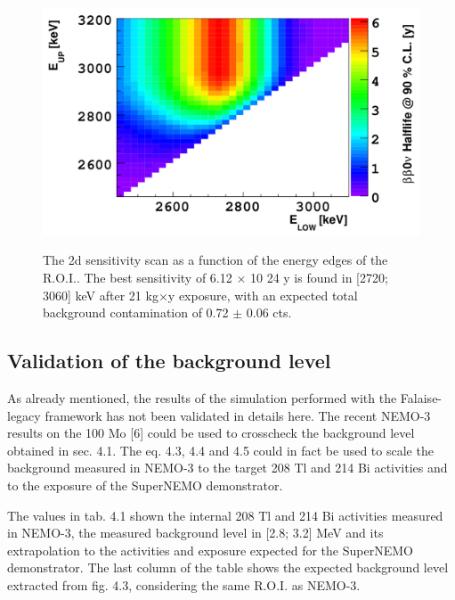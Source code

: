 \documentclass[main.tex]{subfiles}
\begin{document}
\begin{figure}[h!]
\centering
\includegraphics[scale=0.25]{pictures/Chap4/Sens0nu2D.png}
\label{Sens0nu2D.png}
\caption{The 2d sensitivity scan as a function of the energy edges of the R.O.I.. The best sensitivity of 6.12 $\times$ 10 24 y is found in [2720; 3060] keV after 21 kg$\times$y exposure, with an expected total background contamination of 0.72 $\pm$ 0.06 cts.}
\end{figure}


\FloatBarrier


\subsection{Validation of the background level}


\NI As already mentioned, the results of the simulation performed with the Falaise-legacy framework has not been validated in details here. The recent NEMO-3 results on the 100 Mo [6] could be used to crosscheck the background level obtained in sec. 4.1. The eq. 4.3, 4.4 and 4.5 could in fact be used to scale the background measured in NEMO-3 to the target 208 Tl and 214 Bi activities and to the exposure of the SuperNEMO demonstrator.


\bigskip


\NI The values in tab. 4.1 shown the internal 208 Tl and 214 Bi activities measured in NEMO-3, the measured background level in [2.8; 3.2] MeV and its extrapolation to the activities and exposure expected for the SuperNEMO demonstrator. The last column of the table shows the expected background level extracted from fig. 4.3, considering the same R.O.I. as NEMO-3. 


\bigskip
\end{document}
